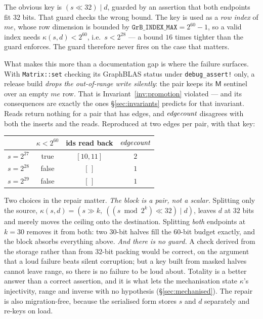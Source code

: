 \documentclass[11pt,a4paper]{article}
\theoremstyle{plain}
\theoremstyle{definition}
\theoremstyle{remark}
\newcommand{\M}{\mathsf{M}}
\begin{document}
The obvious key is $(s \ll 32) \mathbin{|} d$, guarded by an assertion that
both endpoints fit $32$ bits. That guard checks the wrong bound. The key is used
as a \emph{row index} of $me$, whose row dimension is bounded by
$\texttt{GrB\_INDEX\_MAX} = 2^{60}-1$, so a valid index needs
$\kappa(s,d) < 2^{60}$, i.e.\ $s < 2^{28}$ --- a bound $16$ times tighter than
the guard enforces. The guard therefore never fires on the case that matters.

What makes this more than a documentation gap is where the failure surfaces.
With \texttt{Matrix::set} checking its GraphBLAS status under
\texttt{debug\_assert!} only, a release build \emph{drops the out-of-range write
silently}: the pair keeps its $\M$ sentinel over an empty $me$ row. That is
Invariant~\ref{inv:promotion} violated --- and its consequences are exactly the
ones \S\ref{sec:invariants} predicts for that invariant. Reads return nothing
for a pair that has edges, and $\textit{edge\/count}$ disagrees with both the
inserts and the reads. Reproduced at two edges per pair, with that key:

\begin{center}
\begin{tabular}{@{}lccc@{}}
\toprule
& $\kappa < 2^{60}$ & ids read back & $\textit{edge\/count}$ \\
\midrule
$s = 2^{27}$ & true  & $[10, 11]$ & $2$ \\
$s = 2^{28}$ & false & $[\,]$     & $1$ \\
$s = 2^{29}$ & false & $[\,]$     & $1$ \\
\bottomrule
\end{tabular}
\end{center}

Two choices in the repair matter. \emph{The block is a pair, not a scalar.}
Splitting only the source, $\kappa(s,d) = (s \gg k,\ ((s \bmod 2^{k}) \ll 32)
\mathbin{|} d)$, leaves $d$ at $32$ bits and merely moves the ceiling onto the
destination. Splitting \emph{both} endpoints at $k = 30$ removes it from both:
two $30$-bit halves fill the $60$-bit budget exactly, and the block absorbs
everything above. \emph{And there is no guard.} A check derived from the
storage rather than from $32$-bit packing would be correct, on the argument that
a loud failure beats silent corruption; but a key built from masked halves
cannot leave range, so there is no failure to be loud about. Totality is a
better answer than a correct assertion, and it is what lets the mechanisation
state $\kappa$'s injectivity, range and inverse with no hypothesis
(\S\ref{sec:mechanised}). The repair is also migration-free, because the
serialised form stores $s$ and $d$ separately and re-keys on load.
\end{document}
